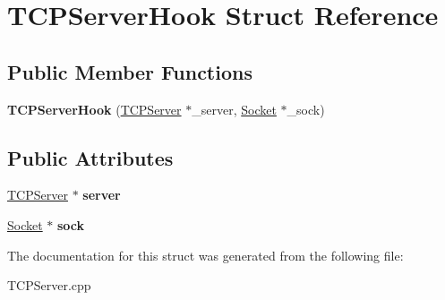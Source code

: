 \hypertarget{structTCPServerHook}{\section{T\-C\-P\-Server\-Hook Struct Reference}
\label{structTCPServerHook}
}
\subsection*{Public Member Functions}
\begin{DoxyCompactItemize}
\item 
\hypertarget{structTCPServerHook_a20bf33f010e41733d8967e81faf65d55}{{\bfseries T\-C\-P\-Server\-Hook} (\hyperlink{classTCPServer}{T\-C\-P\-Server} $\ast$\-\_\-server, \hyperlink{classSocket}{Socket} $\ast$\-\_\-sock)}\label{structTCPServerHook_a20bf33f010e41733d8967e81faf65d55}

\end{DoxyCompactItemize}
\subsection*{Public Attributes}
\begin{DoxyCompactItemize}
\item 
\hypertarget{structTCPServerHook_a172cab2c468d3335864ebd568603de38}{\hyperlink{classTCPServer}{T\-C\-P\-Server} $\ast$ {\bfseries server}}\label{structTCPServerHook_a172cab2c468d3335864ebd568603de38}

\item 
\hypertarget{structTCPServerHook_aca27338d2b39429303166c0ec8cb9110}{\hyperlink{classSocket}{Socket} $\ast$ {\bfseries sock}}\label{structTCPServerHook_aca27338d2b39429303166c0ec8cb9110}

\end{DoxyCompactItemize}


The documentation for this struct was generated from the following file\-:\begin{DoxyCompactItemize}
\item 
T\-C\-P\-Server.\-cpp\end{DoxyCompactItemize}
